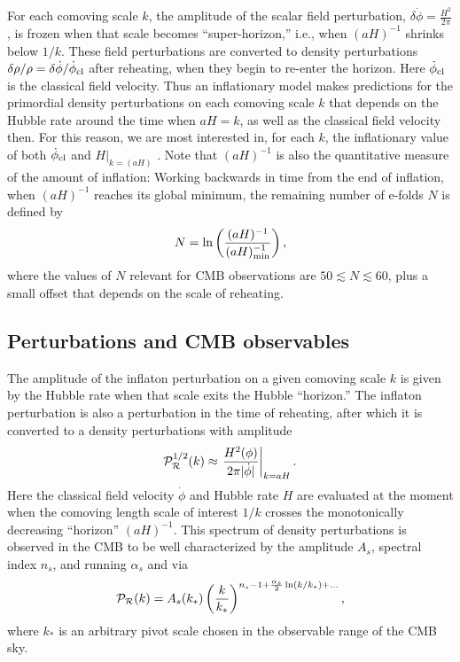 \documentclass[aps,amsfonts,amsmath,prd,preprint,nofootinbib,superscriptaddress]{revtex4}
\begin{document}
For each comoving scale $k$, the amplitude of the scalar field perturbation, $\delta \dot\phi = \frac{H^2}{2\pi}$, is frozen when that scale becomes ``super-horizon,'' i.e., when
$(a H)^{-1}$ shrinks below $1/k$.  These field perturbations are converted to density perturbations $\delta \rho/\rho = \delta \dot\phi/\dot\phi_{\rm cl}$ after reheating, 
when they begin to re-enter the horizon.  Here   $\dot\phi_{\rm cl}$ is the classical field velocity.
Thus an inflationary model makes predictions for the primordial density perturbations on each comoving scale $k$ that depends on the Hubble rate around
the time when $a H = k$, as well as the classical field velocity then.  For this reason, we are most interested in, for each $k$, the inflationary value of both $\dot\phi_{\rm cl}$ and $\left.H\right|_{k=(aH)}$ .  
Note that $(a H)^{-1}$ is
also the quantitative measure of the amount of inflation:  Working backwards in time from the end of inflation, when $(aH)^{-1}$ reaches its global minimum, 
the remaining number of e-folds $N$ is defined by
\begin{align}
N = \ln\left(\frac{(a H)^{-1}}{(a H)^{-1}_{\rm min}}  \right),
\end{align}
where the values of $N$ relevant for CMB observations are $50 \lesssim N \lesssim 60$, plus a small offset that depends on the scale of reheating.


\subsection{Perturbations and CMB observables}
The amplitude of the inflaton perturbation on a given comoving scale $k$ is given by the Hubble rate when that
scale exits the Hubble ``horizon.''   The inflaton perturbation is also a perturbation in the time of reheating, after which it is converted to a density perturbations with
amplitude
\begin{align}
{\cal P}_{\cal R}^{1/2}(k) \approx \left.\frac{H^2(\phi)}{2\pi|\dot\phi|}\right|_{k = a H}.
\end{align}
Here the classical field velocity $\dot\phi$ and Hubble rate $H$ are evaluated at the moment when the comoving length scale of interest $1/k$ crosses the monotonically decreasing ``horizon'' $(aH)^{-1}$.
This spectrum of density perturbations is observed in the CMB to be well characterized by the amplitude $A_s$, spectral index $n_s$, and running $\alpha_s$ and via
\begin{align}
 {\cal P}_{\cal R}(k) = A_s(k_\ast)\left(\frac{k}{k_\ast}\right)^{n_s - 1 + \frac{\alpha_s}{2}\ln(k/k_\ast) + ...},
\end{align}
where $k_\ast$ is an arbitrary pivot scale chosen in the observable range of the CMB sky.
\end{document}
